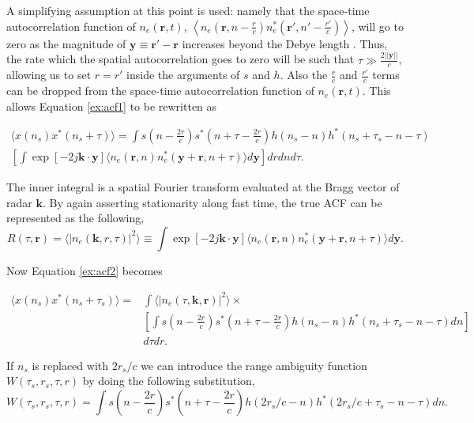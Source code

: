 \noindent A simplifying assumption at this point is used: namely that the space-time autocorrelation function of $n_e(\mathbf{r},t)$, $\left\langle n_e\left(\mathbf{r},n-\frac{r}{c}\right)n^*_e\left(\mathbf{r}',n'-\frac{r'}{c}\right)\right\rangle$, will go to zero as the magnitude of $\mathbf{y} \equiv \mathbf{r}'-\mathbf{r}$ increases beyond the Debye length \citep{farley1969}. Thus, the rate which the spatial autocorrelation goes to zero will be such that $\tau\gg \frac{2||\mathbf{y}||}{c}$, allowing us to set $r= r'$ inside the arguments of $s$ and $h$. Also the $\frac{r}{c}$ and $\frac{r'}{c}$ terms can be dropped from the space-time autocorrelation function of $n_e(\mathbf{r},t)$. This allows Equation \ref{ex:acf1} to be rewritten as 
 
 \begin{multline}
 \label{ex:acf2}
 \langle x(n_s)x^*(n_s+\tau)\rangle = \int s\left(n-\frac{2r}{c}\right)s^*\left(n+\tau -\frac{2r}{c}\right) h(n_s-n)h^*(n_s+\tau_s-n-\tau) \\\left[\int \exp\left[-2j \mathbf{k}\cdot \mathbf{y}\right] \langle n_e(\mathbf{r},n)n^*_e(\mathbf{y}+\mathbf{r},n+\tau)\rangle d\mathbf{y} \right]drdn d\tau.
 \end{multline}

The inner integral is a spatial Fourier transform evaluated at the Bragg vector of radar $\mathbf{k}$. By again asserting stationarity along fast time, the true ACF can be represented as the following,
 \begin{equation}
 \label{eq:spft}
R(\tau,\mathbf{r})= \langle |n_e(\mathbf{k},r,\tau)|^2\rangle \equiv  \int \exp\left[-2j \mathbf{k}\cdot \mathbf{y} \right] \langle n_e(\mathbf{r},n)n^*_e(\mathbf{y}+\mathbf{r},n+\tau)\rangle d\mathbf{y}.
 \end{equation}
 
 \noindent Now Equation \ref{ex:acf2} becomes
 
 \begin{equation}
 \label{eqn:inbetween}
 \begin{split}
 \langle x(n_s)x^*(n_s+\tau_s)\rangle =& \int \langle |n_e(\tau,\mathbf{k},\mathbf{r})|^2\rangle \times\\ &\left[\int s(n-\frac{2r}{c})s^*(n+\tau -\frac{2r}{c})h(n_s-n)h^*(n_s+\tau_s-n-\tau) dn \right]\\ &d\tau dr.
 \end{split}
 \end{equation}

 If $n_s$ is replaced with $2r_s/c$ we can introduce the range ambiguity function $W(\tau_s,r_s,\tau,r)$ by doing the following substitution,
 \begin{equation}
 \label{eqn:rngamb}
 W(\tau_s,r_s,\tau,r)= \int s(n-\frac{2r}{c})s^*(n+\tau -\frac{2r}{c})h(2r_s/c-n)h^*(2r_s/c+\tau_s-n-\tau) dn.
 \end{equation}
 
